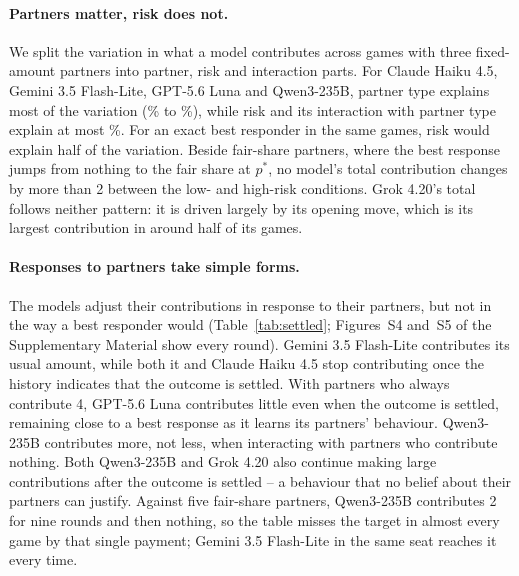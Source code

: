\documentclass[sigconf,anonymous]{aamas}
\newcommand{\popt}{p^{*}}
\begin{document}
\paragraph{Partners matter, risk does not.}
We split the variation in what a model contributes  across games with  three fixed-amount partners  into partner, risk and interaction parts. For Claude Haiku 4.5, Gemini 3.5 Flash-Lite, GPT-5.6 Luna and Qwen3-235B, partner type  explains most of the variation (\ScrOpponentShareMin\% to \ScrOpponentShareMax\%), while risk and its interaction with partner type explain at most  \ScrRiskShareMax\%. For an exact best responder in the same games,  risk would explain half of  the variation. Beside fair-share partners, where the best response jumps from nothing to the fair share at $\popt$, no model’s total contribution changes by more than 2 between the low- and high-risk conditions. Grok 4.20's total follows neither pattern: it is driven largely by its opening move, which is its largest contribution in around half of its games.

\begin{table}[t]
\caption{Units contributed per game before and after the outcome is settled, alongside five partners who always contribute 0 or always contribute 4 (50 games per entry). Given these partners, every unit contributed is wasted; units contributed after settlement are wasted even for an agent unaware that its partners are scripted.}
\label{tab:settled}
\small

\end{table}

\paragraph{Responses to partners take simple forms.}
The models adjust their contributions in response to their partners, but not in the way a best responder would (Table~\ref{tab:settled}; Figures~S4 and~S5 of the Supplementary Material show every round). Gemini 3.5 Flash-Lite contributes  its usual amount, while both it and Claude Haiku 4.5 stop contributing once the history indicates that the outcome is settled. With partners who always contribute 4, GPT-5.6 Luna contributes little even when the outcome is settled, remaining close to a best response as it learns its partners’ behaviour. Qwen3-235B contributes more, not less, when interacting with partners who contribute nothing. Both Qwen3-235B and Grok 4.20 also continue making large contributions after the outcome is settled -- a behaviour that no belief about their partners can justify. Against five fair-share partners, Qwen3-235B contributes  2 for nine rounds and then nothing, so the table misses the target in almost every game by that single payment; Gemini 3.5 Flash-Lite in the same seat reaches it every time.
\end{document}
